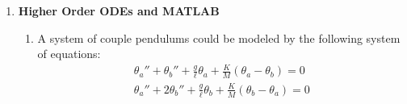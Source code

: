 \documentclass[letterpaper, fontsize=10pt]{scrartcl} %
\numberwithin{equation}{section} %
\numberwithin{figure}{section} %
\numberwithin{table}{section} %
\begin{document}
\begin{enumerate}
%
%

\item \textbf{Higher Order ODEs and MATLAB}
\begin{enumerate}
\item A system of couple pendulums could be modeled by the following system of equations: 
\begin{gather*}
\theta_a'' + \theta_b'' + \frac{g}{\ell}\theta_a + \frac{K}{M}(\theta_a - \theta_b) = 0 \tag{1}\\
\theta_a'' + 2 \theta_b'' + \frac{g}{\ell}\theta_b + \frac{K}{M}(\theta_b - \theta_a) = 0 \tag{2}
\end{gather*}



\end{enumerate}
\end{enumerate}
\end{document}
